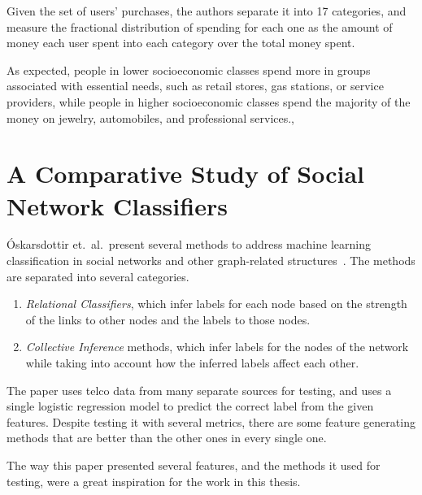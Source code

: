 Given the set of users' purchases, the authors separate it into 17 categories, and measure the fractional distribution of spending for each one as the amount of money each user spent into each category over the total money spent.

As expected, people in lower socioeconomic classes spend more in groups associated with essential needs, such as retail stores, gas stations, or service providers, while people in higher socioeconomic classes spend the majority of the money on jewelry, automobiles, and professional services.,

\section{A Comparative Study of Social Network Classifiers}

Óskarsdottir et.\ al.\ present several methods to address machine learning classification in social networks and other graph-related structures~\cite{oskarsdottir2016}.
The methods are separated into several categories.

\begin{enumerate}
	\item \emph{Relational Classifiers}, which infer labels for each node based on the strength of the links to other nodes and the labels to those nodes.
	\item \emph{Collective Inference} methods, which infer labels for the nodes of the network while taking into account how the inferred labels affect each other.
\end{enumerate}

The paper uses telco data from many separate sources for testing, and uses a single logistic regression model to predict the correct label from the given features.
Despite testing it with several metrics, there are some feature generating methods that are better than the other ones in every single one.

The way this paper presented several features, and the methods it used for testing, were a great inspiration for the work in this thesis.
